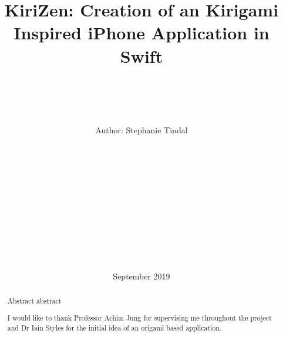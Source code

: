\documentclass[11pt]{article}
\begin{document}
\begin{titlepage}
    \title{\vspace{40pt}\Huge KiriZen: Creation of an Kirigami Inspired iPhone Application in Swift}

    \author{ \\\hline \\\\\\ \Large \vspace{5pt} Author: Stephanie Tindal \\\Large \vspace{5pt}{Student ID: 1936508}\\\Large \vspace{50pt}{Supervisor: Achim Jung} \\ \hline\\\\\\  \vspace{5pt}{MSc Computer Science} \\ \vspace{5pt}{School of Computer Science, University of Birmingham}\\\\\\ \hline\\\\}

    \date{September 2019 \vspace{20pt}}
    \maketitle
\end{titlepage}
    \tableofcontents


\newpage

\begin{abstract}
    Abstract abstract 

\end{abstract}

\vspace{50pt}
\renewcommand{\abstractname}{Acknowledgements}
\begin{abstract}
    I would like to thank Professor Achim Jung for supervising me throughout the project and Dr Iain Styles for the initial idea of an origami based application. 
\end{abstract}
\end{document}
